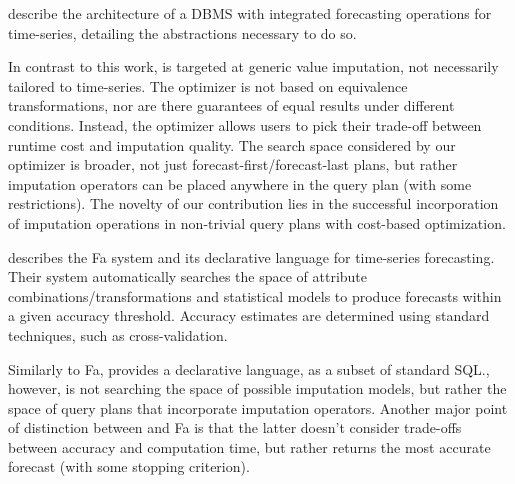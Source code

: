 \cite{fischer2013towards} describe the architecture of a DBMS with integrated forecasting operations for time-series, detailing
the abstractions necessary to do so.

In contrast to this work, \ProjectName{} is targeted at generic value imputation, not necessarily tailored to 
time-series. The optimizer is not based on equivalence transformations, nor are there guarantees of equal
results under different conditions. Instead, the optimizer allows users to pick their trade-off between
runtime cost and imputation quality. The search space considered by our optimizer is broader, not just
forecast-first/forecast-last plans, but rather imputation operators can be placed anywhere in the query plan
(with some restrictions). The novelty of our contribution lies in the successful incorporation of
imputation operations in non-trivial query plans with cost-based optimization.

\cite{duan2007processing} describes the Fa system and its declarative language for time-series forecasting. Their
system automatically searches the space of attribute combinations/transformations and statistical models
to produce forecasts within a given accuracy threshold. Accuracy estimates are determined using
standard techniques, such as cross-validation. 

Similarly to Fa, \ProjectName{} provides a declarative language, as
a subset of standard SQL.\@ \ProjectName{}, however, is not searching the space of possible
imputation models, but rather the space of query plans that incorporate imputation operators. Another major point
of distinction between \ProjectName{} and Fa is that the latter doesn't consider trade-offs between accuracy and computation time, but rather returns the most accurate forecast (with some stopping criterion).



